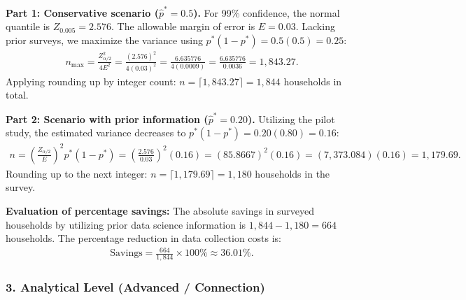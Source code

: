 \begin{solproblema}
	\textbf{Part 1: Conservative scenario ($\hat{p}^* = 0.5$).}
	For 99\% confidence, the normal quantile is $Z_{0.005} = 2.576$. The allowable margin of error is $E = 0.03$. Lacking prior surveys, we maximize the variance using $p^*(1-p^*) = 0.5(0.5) = 0.25$:
	\begin{align}
		n_{\text{max}} = \frac{Z_{\alpha/2}^2}{4 E^2} = \frac{(2.576)^2}{4 (0.03)^2} = \frac{6.635776}{4 (0.0009)} = \frac{6.635776}{0.0036} = 1,843.27.
	\end{align}
	Applying rounding up by integer count: $n = \lceil 1,843.27 \rceil = 1,844$ households in total.
	
	\textbf{Part 2: Scenario with prior information ($\hat{p}^* = 0.20$).}
	Utilizing the pilot study, the estimated variance decreases to $p^*(1-p^*) = 0.20(0.80) = 0.16$:
	\begin{align}
		n = \left( \frac{Z_{\alpha/2}}{E} \right)^2 p^*(1-p^*) = \left( \frac{2.576}{0.03} \right)^2 (0.16) = (85.8667)^2 (0.16) = (7,373.084)(0.16) = 1,179.69.
	\end{align}
	Rounding up to the next integer: $n = \lceil 1,179.69 \rceil = 1,180$ households in the survey.
	
	\textbf{Evaluation of percentage savings:}
	The absolute savings in surveyed households by utilizing prior data science information is $1,844 - 1,180 = 664$ households. The percentage reduction in data collection costs is:
	\begin{align}
		\text{Savings} = \frac{664}{1,844} \times 100\% \approx 36.01\%.
	\end{align}
\end{solproblema}

\subsubsection*{3. Analytical Level (Advanced / Connection)}

